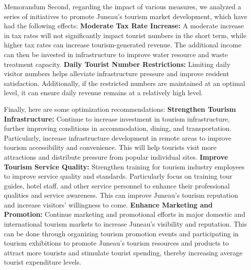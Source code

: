 \documentclass[12pt]{article}  %
\begin{document}
\begin{letter}{Memorandum}
Second, regarding the impact of various measures, we analyzed a series of initiatives to promote Juneau's tourism market development, which have had the following effects:
\textbf{Moderate Tax Rate Increase:} A moderate increase in tax rates will not significantly impact tourist numbers in the short term, while higher tax rates can increase tourism-generated revenue. The additional income can then be invested in infrastructure to improve water resource and waste treatment capacity.
\textbf{Daily Tourist Number Restrictions:} Limiting daily visitor numbers helps alleviate infrastructure pressure and improve resident satisfaction. Additionally, if the restricted numbers are maintained at an optimal level, it can ensure daily revenue remains at a relatively high level.

Finally, here are some optimization recommendations:
\textbf{Strengthen Tourism Infrastructure:} Continue to increase investment in tourism infrastructure, further improving conditions in accommodation, dining, and transportation. Particularly, increase infrastructure development in remote areas to improve tourism accessibility and convenience. This will help tourists visit more attractions and distribute pressure from popular individual sites.
\textbf{Improve Tourism Service Quality:} Strengthen training for tourism industry employees to improve service quality and standards. Particularly focus on training tour guides, hotel staff, and other service personnel to enhance their professional qualities and service awareness. This can improve Juneau's tourism reputation and increase visitors' willingness to come.
\textbf{Enhance Marketing and Promotion:} Continue marketing and promotional efforts in major domestic and international tourism markets to increase Juneau's visibility and reputation. This can be done through organizing tourism promotion events and participating in tourism exhibitions to promote Juneau's tourism resources and products to attract more tourists and stimulate tourist spending, thereby increasing average tourist expenditure levels.

\end{letter}
\end{document}
